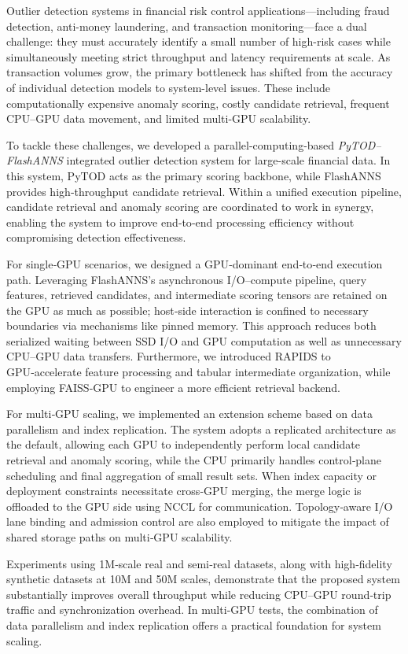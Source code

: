 \begin{abstract*}
Outlier detection systems in financial risk control applications—including fraud detection, anti-money laundering, and transaction monitoring—face a dual challenge: they must accurately identify a small number of high-risk cases while simultaneously meeting strict throughput and latency requirements at scale. As transaction volumes grow, the primary bottleneck has shifted from the accuracy of individual detection models to system-level issues. These include computationally expensive anomaly scoring, costly candidate retrieval, frequent CPU–GPU data movement, and limited multi-GPU scalability.

To tackle these challenges, we developed a parallel-computing-based \emph{PyTOD--FlashANNS} integrated outlier detection system for large-scale financial data. In this system, PyTOD acts as the primary scoring backbone, while FlashANNS provides high‑throughput candidate retrieval. Within a unified execution pipeline, candidate retrieval and anomaly scoring are coordinated to work in synergy, enabling the system to improve end‑to‑end processing efficiency without compromising detection effectiveness.

For single‑GPU scenarios, we designed a GPU‑dominant end‑to‑end execution path. Leveraging FlashANNS's asynchronous I/O–compute pipeline, query features, retrieved candidates, and intermediate scoring tensors are retained on the GPU as much as possible; host‑side interaction is confined to necessary boundaries via mechanisms like pinned memory. This approach reduces both serialized waiting between SSD I/O and GPU computation as well as unnecessary CPU–GPU data transfers. Furthermore, we introduced RAPIDS to GPU‑accelerate feature processing and tabular intermediate organization, while employing FAISS‑GPU to engineer a more efficient retrieval backend.

For multi‑GPU scaling, we implemented an extension scheme based on data parallelism and index replication. The system adopts a replicated architecture as the default, allowing each GPU to independently perform local candidate retrieval and anomaly scoring, while the CPU primarily handles control‑plane scheduling and final aggregation of small result sets. When index capacity or deployment constraints necessitate cross‑GPU merging, the merge logic is offloaded to the GPU side using NCCL for communication. Topology‑aware I/O lane binding and admission control are also employed to mitigate the impact of shared storage paths on multi‑GPU scalability.

Experiments using 1M‑scale real and semi‑real datasets, along with high‑fidelity synthetic datasets at 10M and 50M scales, demonstrate that the proposed system substantially improves overall throughput while reducing CPU–GPU round‑trip traffic and synchronization overhead. In multi‑GPU tests, the combination of data parallelism and index replication offers a practical foundation for system scaling.
\end{abstract*}
